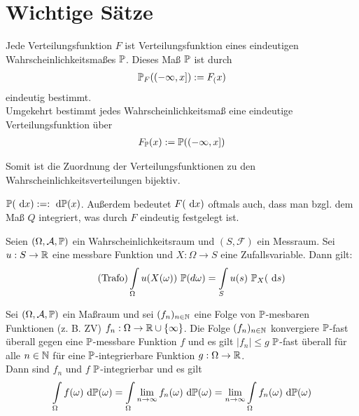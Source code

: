 \section{Wichtige Sätze}
\begin{satz}[Korrespondenzsatz]\label{satzKorrespondenzsatz}\enter
Jede Verteilungsfunktion $F$ ist Verteilungsfunktion eines eindeutigen Wahrscheinlichkeitsmaßes $\P$. Dieses Maß $\P$ ist durch
\begin{align*}
\P_F((-\infty,x]):=F_(x)
\end{align*}
eindeutig bestimmt.\\
Umgekehrt bestimmt jedes Wahrscheinlichkeitsmaß eine eindeutige Verteilungsfunktion über
\begin{align*}
F_{\P}(x):=\P((-\infty,x])
\end{align*}

Somit ist die Zuordnung der Verteilungsfunktionen zu den Wahrscheinlichkeitsverteilungen bijektiv. 
\end{satz}

\begin{notation}
$\P(\d x):=:\d\P(x)$. Außerdem bedeutet $F(\d x)$ oftmals auch, dass man bzgl. dem Maß $Q$ integriert, was durch $F$ eindeutig festgelegt ist.
\end{notation}

\begin{satz}[Transformationssatz]\label{satzTransformationssatz}\enter
Seien $(\Omega,\A,\P)$ ein Wahrscheinlichkeitsraum und $(S,\mathcal{F})$ ein Messraum.
Sei $u:S\to\R$ eine messbare Funktion und $X:\Omega\to S$ eine Zufallsvariable. Dann gilt:
\begin{align}\label{eqTrafo}\tag{Trafo}
\int\limits_\Omega u(X(\omega))~\P(d\omega)=\int\limits_S u(s)~\P_X(\d s)
\end{align}
\end{satz}

\begin{satz}\label{satzMajorisierteKonvergenz}\enter
Sei $(\Omega,\A,\P)$ ein Maßraum und sei $(f_n)_{n\in\N}$ eine Folge von $\P$-mesbaren Funktionen (z. B. ZV) $f_n:\Omega\to\R\cup\lbrace\infty\rbrace$. Die Folge $(f_n)_{n\in\N}$ konvergiere $\P$-fast überall gegen eine $\P$-messbare Funktion $f$ und es gilt $|f_n|\leq g$ $\P$-fast überall für alle $n\in\N$ für eine $\P$-integrierbare Funktion $g:\Omega\to\R$.\\
Dann sind $f_n$ und $f$ $\P$-integrierbar und es gilt
\begin{align*}
\int\limits_\Omega f(\omega)\d\P(\omega)=\int\limits_\Omega \limn f_n(\omega)\d\P(\omega)
=\limn\int\limits_\Omega f_n(\omega)\d\P(\omega)
\end{align*}
\end{satz}

